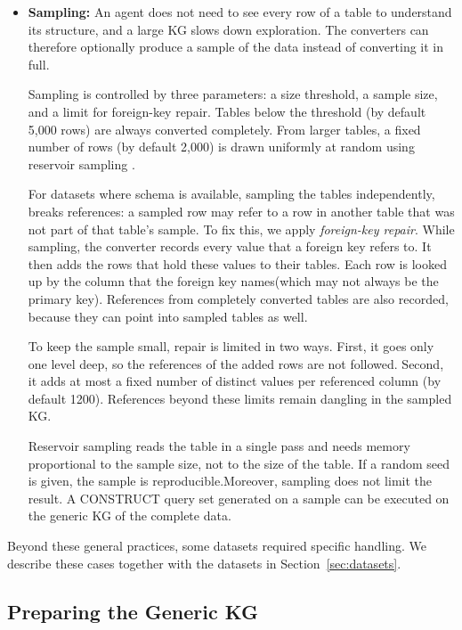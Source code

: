 \begin{itemize}[leftmargin=*, itemsep=2pt]
  \item \textbf{Sampling:} An agent does not need to see every row of a table to understand its structure, and a large KG slows down exploration. The converters can therefore optionally produce a sample of the data instead of converting it in full. 
  
  Sampling is controlled by three parameters: a size threshold, a sample size, and a limit for foreign-key repair. Tables below the threshold (by default 5{,}000 rows) are always converted completely. From larger tables, a fixed number of rows (by default 2{,}000) is drawn uniformly at random using reservoir sampling \citep{vitter1985random}. 

  For datasets where schema is available, sampling the tables independently, breaks references: a sampled row may refer to a row in another table that was not part of that table's sample. To fix this, we apply \emph{foreign-key repair}. While sampling, the converter records every value that a foreign key refers to. It then adds the rows that hold these values to their tables. Each row is looked up by the column that the foreign key names(which may not always be the primary key). References from completely converted tables are also recorded, because they can point into sampled tables as well. 
  
  To keep the sample small, repair is limited in two ways. First, it goes only one level deep, so the references of the added rows are not followed. Second, it adds at most a fixed number of distinct values per referenced column (by default 1200). References beyond these limits remain dangling in the sampled KG.


  Reservoir sampling reads the table in a single pass and needs memory proportional to the sample size, not to the size of the table. If a random seed is given, the sample is reproducible.Moreover, sampling does not limit the result. A CONSTRUCT query set generated on a sample can be executed on the generic KG of the complete data.
\end{itemize}
Beyond these general practices, some datasets required specific handling. We describe these cases together with the datasets in Section~\ref{sec:datasets}.

\clearpage

\subsection{Preparing the Generic KG}\label{sec:approach-setup}

